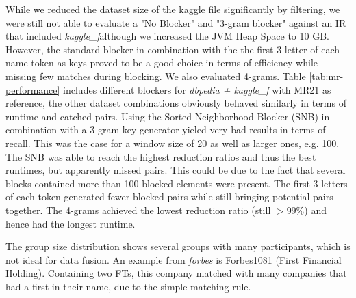\documentclass[11pt,titlepage,oneside,openany]{article}
\begin{document}
While we reduced the dataset size of the kaggle file significantly by filtering, we were still not able to evaluate a "No Blocker" and "3-gram blocker" against an IR that included \textit{kaggle\_f}although we increased the JVM Heap Space to 10 GB. However, the standard blocker in combination with the the first 3 letter of each name token as keys proved to be a good choice in terms of efficiency while missing few matches during blocking. We also evaluated 4-grams. Table \ref{tab:mr-performance} includes different blockers for \textit{dbpedia + kaggle\_f} with MR21 as reference, the other dataset combinations obviously behaved similarly in terms of runtime and catched pairs. Using the Sorted Neighborhood Blocker (SNB) in combination with a 3-gram key generator yieled very bad results in terms of recall. This was the case for a window size of 20 as well as larger ones, e.g. 100. The SNB was able to reach the highest reduction ratios and thus the best runtimes, but apparently missed pairs. This could be due to the fact that several blocks contained more than 100 blocked elements were present. The first 3 letters of each token generated fewer blocked pairs while still bringing potential pairs together. The 4-grams achieved the lowest reduction ratio (still $>$99\%) and hence had the longest runtime.

The group size distribution shows several groups with many participants, which is not ideal for data fusion. An example from \textit{forbes} is Forbes1081 (First Financial Holding). Containing two FTs, this company matched with many companies that had a first in their name, due to the simple matching rule.
\end{document}

